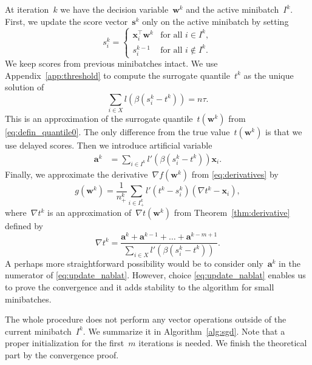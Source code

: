 At iteration~$k$ we have the decision variable~$\bm{w}^k$ and the active minibatch~$I^k$. First, we update the score vector~$\bm{s}^k$ only on the active minibatch by setting
\begin{equation}\label{eq:defin_z}
  s_i^k = \begin{cases} \bm{x}_i^\top \bm{w}^k &\text{for all }i\in I^k,\\ s_i^{k-1} &\text{for all }i\notin I^k.\end{cases} 
\end{equation}
We keep scores from previous minibatches intact. We use Appendix~\ref{app:threshold} to compute the surrogate quantile~$t^k$ as the unique solution of
\begin{equation}\label{eq:update_t}
  \sum_{i \in X}l(\beta(s_i^k - t^k)) = n\tau.
\end{equation}
This is an approximation of the surrogate quantile~$t(\bm{w}^k)$ from \eqref{eq:defin_quantile0}. The only difference from the true value~$t(\bm{w}^k)$ is that we use delayed scores. Then we introduce artificial variable
\begin{equation}\label{eq:update_a}
  \begin{aligned}
    \bm{a}^k &= \sum_{i\in I^k}l'(\beta(s_i^k - t^k))\bm{x}_i.
  \end{aligned}
\end{equation}
Finally, we approximate the derivative~$\nabla f(\bm{w}^k)$ from \eqref{eq:derivatives} by
\begin{equation}\label{eq:update_g}
  g(\bm{w}^k) = \frac{1}{n^k_+}\sum_{i\in I^k_+}l'(t^k - s_i^k)(\nabla t^k - \bm{x}_i),
\end{equation}
where~$\nabla t^k$ is an approximation of~$\nabla t(\bm{w}^k)$ from Theorem~\ref{thm:derivative} defined by
\begin{equation}\label{eq:update_nablat}
  \nabla t^k = \frac{\bm{a}^k + \bm{a}^{k-1} + \dots + \bm{a}^{k - m + 1}}{\sum_{i \in X} l'(\beta(s_i^k - t^k))}.
\end{equation}
A perhaps more straightforward possibility would be to consider only~$\bm{a}^k$ in the numerator of \eqref{eq:update_nablat}. However, choice \eqref{eq:update_nablat} enables us to prove the convergence and it adds stability to the algorithm for small minibatches.

The whole procedure does not perform any vector operations outside of the current minibatch~$I^k$. We summarize it in Algorithm~\ref{alg:sgd}. Note that a proper initialization for the first~$m$ iterations is needed. We finish the theoretical part by the convergence proof.

